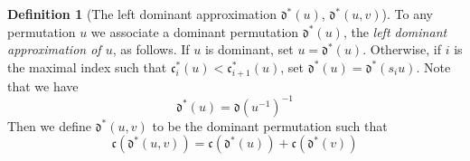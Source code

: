 \documentclass[reqno]{amsart}
\newtheorem{lemma}{Lemma}[subsection]
\theoremstyle{definition}
\newtheorem{definition}[lemma]{Definition}
\theoremstyle{remark}
\numberwithin{equation}{subsection}
\newcommand{\desc}{\mathrm{Desc}}%
\newcommand{\dom}{\mathfrak{d}}
\newcommand{\ldom}{\dom^*}
\newcommand{\code}{\mathfrak{c}}
\begin{document}
%


\begin{definition}[The left dominant approximation $\ldom(u)$, $\ldom(u,v)$] \label{definition:leftdom}
To any permutation $u$ we associate a dominant permutation $\ldom(u)$, the \emph{left dominant approximation of $u$}, as follows. If $u$ is dominant, set $u=\ldom(u)$. Otherwise, if $i$ is the maximal index such that $\code_i^*(u)<\code_{i+1}^*(u)$, set $\ldom(u)=\ldom(s_iu)$. Note that we have
$$\ldom(u)=\dom(u^{-1})^{-1}$$
Then we define $\ldom(u,v)$ to be the dominant permutation such that
$$\code(\ldom(u,v))=\code(\ldom(u))+\code(\ldom(v))$$
\end{definition}
\end{document}
